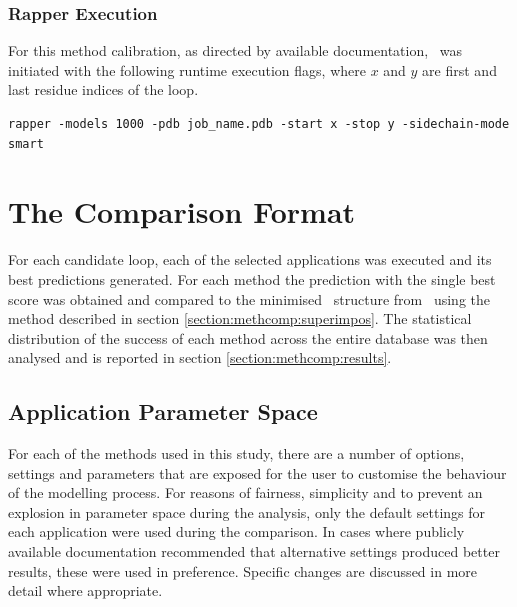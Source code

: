 \subsubsection{Rapper Execution}

For this method calibration, as directed by available documentation, \rapper\ was initiated with the following runtime execution flags, where $x$ and $y$ are first and last residue indices of the loop.

\begin{lstlisting}[caption={The command-line used for \rapper\ execution.}, label=listing:methcomp:rapper]
rapper -models 1000 -pdb job_name.pdb -start x -stop y -sidechain-mode smart
\end{lstlisting} 






\section{The Comparison Format}
\label{section:methcomp:comparison_format}

For each candidate loop, each of the selected applications was
executed and its best predictions generated. For
each method the prediction with the single best
score was obtained and compared to the minimised \xray\ structure from \thothloopdb\ using the method
described in section \ref{section:methcomp:superimpos}. The statistical
distribution of the success of each method across the entire database was
then analysed and is reported in section \ref{section:methcomp:results}. 
\subsection{Application Parameter Space}

For each of the methods used in this study, there are a number of options, settings and parameters that are exposed for the user to customise the behaviour
of the modelling process. For reasons of fairness, simplicity and to prevent an explosion in parameter space during the analysis, only the default settings for each application were used during the comparison. In cases where publicly available documentation recommended that alternative settings produced better results, these were used in preference. Specific changes are discussed in more detail where appropriate.

   

